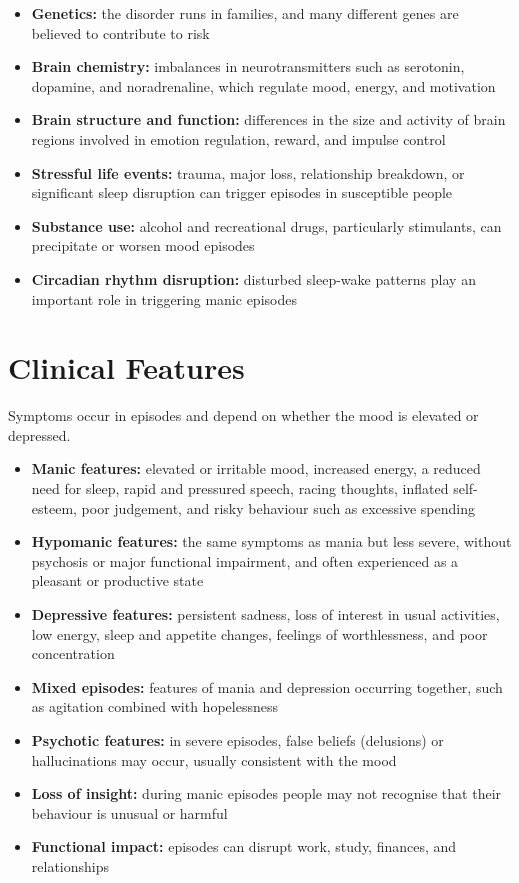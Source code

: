 \begin{itemize}
    \item \textbf{Genetics:} the disorder runs in families, and many different genes are believed to contribute to risk
    \item \textbf{Brain chemistry:} imbalances in neurotransmitters such as serotonin, dopamine, and noradrenaline, which regulate mood, energy, and motivation
    \item \textbf{Brain structure and function:} differences in the size and activity of brain regions involved in emotion regulation, reward, and impulse control
    \item \textbf{Stressful life events:} trauma, major loss, relationship breakdown, or significant sleep disruption can trigger episodes in susceptible people
    \item \textbf{Substance use:} alcohol and recreational drugs, particularly stimulants, can precipitate or worsen mood episodes
    \item \textbf{Circadian rhythm disruption:} disturbed sleep-wake patterns play an important role in triggering manic episodes
\end{itemize}

\section*{Clinical Features}
Symptoms occur in episodes and depend on whether the mood is elevated or depressed.

\begin{itemize}
    \item \textbf{Manic features:} elevated or irritable mood, increased energy, a reduced need for sleep, rapid and pressured speech, racing thoughts, inflated self-esteem, poor judgement, and risky behaviour such as excessive spending
    \item \textbf{Hypomanic features:} the same symptoms as mania but less severe, without psychosis or major functional impairment, and often experienced as a pleasant or productive state
    \item \textbf{Depressive features:} persistent sadness, loss of interest in usual activities, low energy, sleep and appetite changes, feelings of worthlessness, and poor concentration
    \item \textbf{Mixed episodes:} features of mania and depression occurring together, such as agitation combined with hopelessness
    \item \textbf{Psychotic features:} in severe episodes, false beliefs (delusions) or hallucinations may occur, usually consistent with the mood
    \item \textbf{Loss of insight:} during manic episodes people may not recognise that their behaviour is unusual or harmful
    \item \textbf{Functional impact:} episodes can disrupt work, study, finances, and relationships
\end{itemize}

